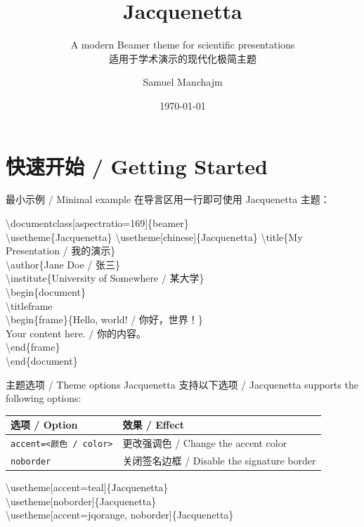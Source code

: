 \documentclass[aspectratio=169]{beamer}
\title{Jacquenetta}
\subtitle{A modern Beamer theme for scientific presentations\\适用于学术演示的现代化极简主题}
\author{Samuel Manchajm}
\institute{GitHub --- Jacquenetta-beamer-theme}
\date{\today}
\begin{document}
\titleframe
\logo{}

\section{快速开始 / Getting Started}

\begin{frame}{最小示例 / Minimal example}
    在导言区用一行即可使用 Jacquenetta 主题：

    \vspace{0.1cm}
    {\small\ttfamily
    \textbackslash documentclass[aspectratio=169]\{beamer\}\\
    \textbackslash usetheme\{Jacquenetta\}\quad %
    \textbackslash usetheme[chinese]\{Jacquenetta\}\quad %
    \textbackslash title\{My Presentation / 我的演示\}\\
    \textbackslash author\{Jane Doe / 张三\}\\
    \textbackslash institute\{University of Somewhere / 某大学\}\\[2pt]
    \textbackslash begin\{document\}\\
    \quad\textbackslash titleframe\\
    \quad\textbackslash begin\{frame\}\{Hello, world! / 你好，世界！\}\\
    \quad\quad Your content here. / 你的内容。\\
    \quad\textbackslash end\{frame\}\\
    \textbackslash end\{document\}
    }
\end{frame}

\begin{frame}{主题选项 / Theme options}
    Jacquenetta 支持以下选项 / Jacquenetta supports the following options:

    \vspace{0.3cm}
    \begin{tabular}{ll}
        \toprule
        \textbf{选项 / Option} & \textbf{效果 / Effect} \\
        \midrule
        \texttt{accent=<颜色 / color>} & 更改强调色 / Change the accent color \\
        \texttt{noborder}       & 关闭签名边框 / Disable the signature border \\
        \bottomrule
    \end{tabular}

    \vspace{0.5cm}
    {\small\ttfamily
    \textbackslash usetheme[accent=teal]\{Jacquenetta\}\\
    \textbackslash usetheme[noborder]\{Jacquenetta\}\\
    \textbackslash usetheme[accent=jqorange, noborder]\{Jacquenetta\}
    }
\end{frame}
\end{document}

